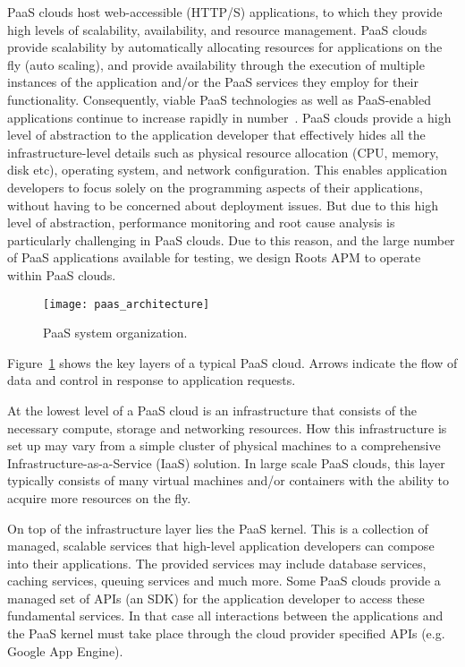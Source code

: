 PaaS clouds host web-accessible (HTTP/S) applications, to which they provide 
high levels of scalability, availability, and resource management. 
PaaS clouds provide scalability by automatically allocating resources 
for applications on the fly (auto scaling), and provide availability through
the execution of multiple instances of the application and/or the PaaS
services they employ for their functionality.
Consequently, viable PaaS technologies as well as
PaaS-enabled applications continue to increase rapidly in number~\cite{paas-growth}.
PaaS clouds provide a high level of abstraction to the application developer that effectively hides
all the infra\-structure-level details such as physical resource allocation (CPU, memory, disk etc), operating
system,
and network configuration. This enables application developers to focus solely on the programming
aspects of their applications, without having to be concerned about deployment issues. But
due to this high level of abstraction, performance monitoring and root cause analysis
is particularly challenging in PaaS clouds. Due to this reason, and the large number of 
PaaS applications available for testing, we design Roots APM to operate within PaaS
clouds.

\begin{figure}
\centering
\texttt{[image: paas\_architecture]}
\caption{PaaS system organization.}
\label{fig:paas_architecture}
\end{figure}

Figure~\ref{fig:paas_architecture} shows the key layers of a typical PaaS cloud. Arrows indicate
the flow of data and control in response to application requests.

At the lowest level of a PaaS cloud is an infrastructure that consists of the necessary compute, storage
and networking resources. How this infrastructure is set up may vary from a simple cluster of physical 
machines to a comprehensive Infrastructure-as-a-Service (IaaS) solution. In large scale PaaS clouds,
this layer typically consists of many virtual machines and/or containers with the ability to acquire more
resources on the fly.

On top of the infrastructure layer lies the PaaS kernel. This is a collection of managed, scalable
services that high-level application developers can compose into their applications. The provided services
may include database services, caching services, queuing services and much more. Some PaaS clouds
provide a managed set of APIs (an SDK) for the application developer to access these fundamental services. 
In that case all interactions between the applications and the PaaS kernel must take place through
the cloud provider specified APIs (e.g. Google App Engine). 

